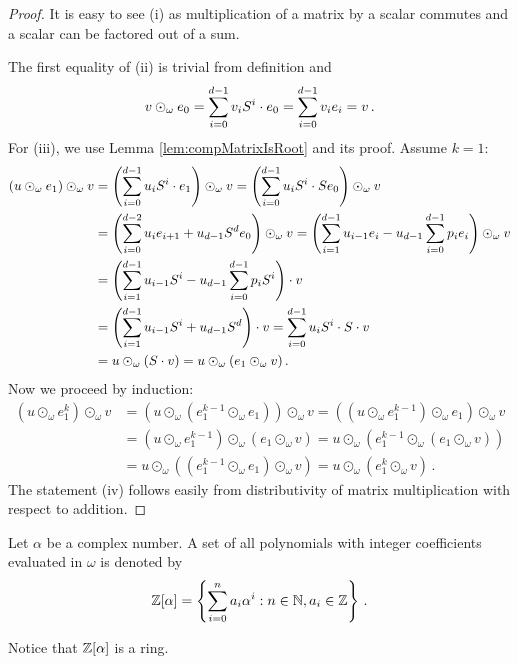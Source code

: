 \begin{proof}
It is easy to see (i) as multiplication of a matrix by a scalar commutes and a scalar can be factored out of a sum. 

The first equality of (ii) is trivial from definition and
$$
v \odot_\omega e_0=\sum_{i=0}^{d-1} {v}_i S^i\cdot e_0= \sum_{i=0}^{d-1} v_i e_i = v\,.
$$
For (iii), we use Lemma \ref{lem:compMatrixIsRoot} and its proof. Assume $k=1$:
\begin{align*}
(u \odot_\omega e_1)\odot_\omega v &= \left(\sum_{i=0}^{d-1} {u}_i S^i \cdot e_1\right) \odot_\omega v = \left(\sum_{i=0}^{d-1} {u}_i S^i \cdot S e_0\right) \odot_\omega v \\
    &=\left(\sum_{i=0}^{d-2}u_i e_{i+1} + u_{d-1} S^d e_{0} \right)\odot_\omega v= \left(\sum_{i=1}^{d-1}u_{i-1} e_{i} - u_{d-1} \sum_{i=0}^{d-1} p_i e_{i} \right)\odot_\omega v \\
    &=\left(\sum_{i=1}^{d-1}u_{i-1}S^i - u_{d-1} \sum_{i=0}^{d-1}p_i S^i \right)\cdot v \\
    &=\left(\sum_{i=1}^{d-1}u_{i-1}S^i  + u_{d-1}S^d\right)\cdot v =\sum_{i=0}^{d-1}u_{i}S^i\cdot S\cdot v \\
    &=u \odot_\omega (S\cdot v)=u \odot_\omega (e_1\odot_\omega v)\,.
\end{align*}
Now we proceed by induction:
\begin{align*}
\left(u \odot_\omega e_1^k\right)\odot_\omega v &=\left(u \odot_\omega (e_1^{k-1}\odot_\omega e_1) \right)\odot_\omega v = \left((u \odot_\omega e_1^{k-1})\odot_\omega e_1 \right)\odot_\omega v \\
    &= (u \odot_\omega e_1^{k-1})\odot_\omega \left(e_1 \odot_\omega v \right)= u \odot_\omega \left( e_1^{k-1}\odot_\omega (e_1 \odot_\omega v )\right)\\
    &= u \odot_\omega \left(( e_1^{k-1}\odot_\omega e_1 )\odot_\omega v \right) = u \odot_\omega \left(e_1^k\odot_\omega v\right)\,.
\end{align*}
The statement (iv) follows easily from distributivity of matrix multiplication with respect to addition. 
\end{proof}




\begin{defn}
Let $\alpha$ be a complex number. A set of all polynomials with integer coefficients evaluated in $\omega$ is denoted by
$$
    \mathbb{Z}[\alpha] =\left\{\sum_{i=0}^n a_i \alpha^i : n\in\mathbb{N}, a_i\in\mathbb{Z} \right\}\,.
$$
\end{defn}
Notice that $\mathbb{Z}[\alpha]$ is a ring.

